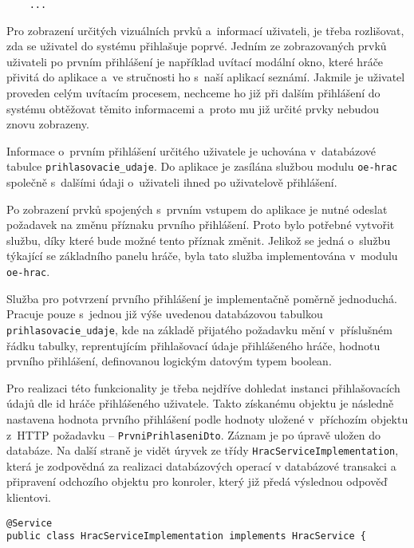 \documentclass[12pt]{article}
\begin{document}
{\begin{lstlisting}
    ...

\end{lstlisting}

\clearpage



Pro zobrazení určitých vizuálních prvků a~informací uživateli, je třeba rozlišovat,
zda se uživatel do systému přihlašuje poprvé. Jedním ze zobrazovaných prvků uživateli po prvním přihlášení je například uvítací modální okno,
které hráče přivitá do aplikace a~ve stručnosti ho s~naší aplikací seznámí.
Jakmile je uživatel proveden celým uvítacím procesem, nechceme ho již při dalším přihlášení do systému
obtěžovat těmito informacemi a~proto mu již určité prvky nebudou znovu zobrazeny.

Informace o~prvním přihlášení určitého uživatele je uchována v~databázové tabulce \texttt{prihlasovacie\_udaje}.
Do aplikace je zasílána službou modulu \texttt{oe-hrac} společně s~dalšími údaji o~uživateli ihned po uživatelově přihlášení.

Po zobrazení prvků spojených s~prvním vstupem do aplikace je nutné odeslat požadavek na změnu příznaku prvního přihlášení.
Proto bylo potřebné vytvořit službu, díky které bude možné tento příznak změnit.
Jelikož se jedná o~službu týkající se základního panelu hráče, byla tato služba implementována v~modulu \texttt{oe-hrac}.

Služba pro potvrzení prvního přihlášení je implementačně poměrně jednoduchá.
Pracuje pouze s~jednou již výše uvedenou databázovou tabulkou \texttt{prihlasovacie\_udaje},
kde na základě přijatého požadavku mění v~příslušném řádku tabulky,
reprentujícím přihlašovací údaje přihlášeného hráče, hodnotu prvního přihlášení,
definovanou logickým datovým typem boolean.

Pro realizaci této funkcionality je třeba nejdříve dohledat instanci přihlašovacích údajů dle id hráče přihlášeného uživatele.
Takto získanému objektu je následně nastavena hodnota prvního přihlášení
podle hodnoty uložené v~příchozím objektu z~HTTP požadavku -- \texttt{PrvniPrihlaseniDto}.
Záznam je po úpravě uložen do databáze.
Na další straně je vidět úryvek ze třídy \texttt{HracServiceImplementation},
která je zodpovědná za realizaci databázových operací v databázové transakci
a připravení odchozího objektu pro konroler, který již předá výslednou odpověď klientovi.

\clearpage

\begin{lstlisting}
@Service
public class HracServiceImplementation implements HracService {


\end{lstlisting}}
\end{document}
